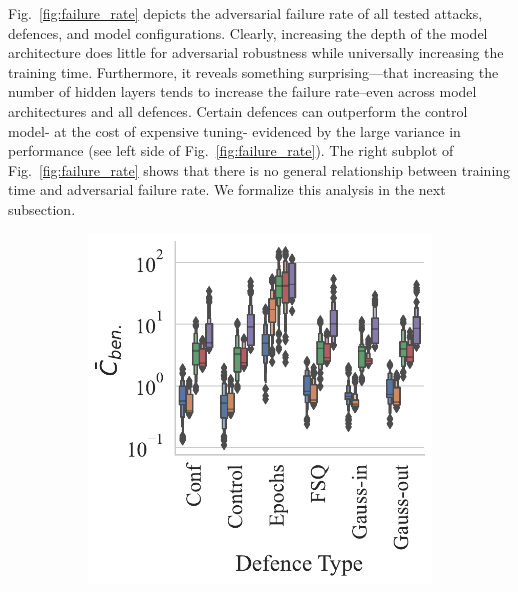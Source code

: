 Fig.~\ref{fig:failure_rate} depicts the adversarial failure rate of all tested attacks, defences, and model configurations. Clearly, increasing the depth of the model architecture does little for adversarial robustness while universally increasing the training time. Furthermore, it reveals something surprising---that increasing the number of hidden layers tends to increase the failure rate--even across model architectures and all defences. Certain defences can outperform the control model- at the cost of expensive tuning- evidenced by the large variance in performance (see left side of Fig.~\ref{fig:failure_rate}). The right subplot of Fig.~\ref{fig:failure_rate} shows that there is no general relationship between training time and adversarial failure rate. We formalize this analysis  in the next subsection.


\begin{figure}
    \centering
    \begin{subfigure}{.28\textwidth}
        \centering
        \includegraphics[width=\textwidth]{cifar/ben_failures_per_train_time_vs_defence_type.pdf}
    \end{subfigure}
    \begin{subfigure}{0.28\textwidth}

\end{subfigure}
\end{figure}
